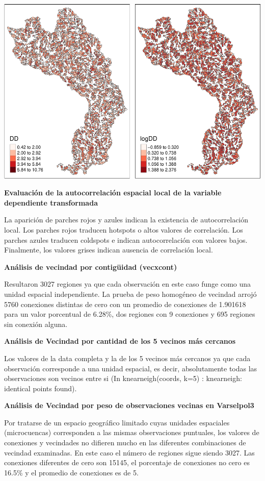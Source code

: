 \documentclass[11pt,]{article}
\begin{document}
\includegraphics{proyecto_f_files/figure-latex/unnamed-chunk-16-1.pdf}

\textbf{Evaluación de la autocorrelación espacial local de la variable
dependiente transformada}

La aparición de parches rojos y azules indican la existencia de
autocorrelación local. Los parches rojos traducen hotspots o altos
valores de correlación. Los parches azules traducen coldspots e indican
autocorrelación con valores bajos. Finalmente, los valores grises
indican ausencia de correlación local.

\textbf{Análisis de vecindad por contigüidad (vecxcont)}

Resultaron 3027 regiones ya que cada observación en este caso funge como
una unidad espacial independiente. La prueba de peso homogéneo de
vecindad arrojó 5760 conexiones distintas de cero con un promedio de
conexiones de 1.901618 para un valor porcentual de 6.28\%, dos regiones
con 9 conexiones y 695 regiones sin conexión alguna.

\textbf{Análisis de Vecindad por cantidad de los 5 vecinos más cercanos}

Los valores de la data completa y la de los 5 vecinos más cercanos ya
que cada observación corresponde a una unidad espacial, es decir,
absolutamente todas las observaciones son vecinos entre si (In
knearneigh(coords, k=5) : knearneigh: identical points found).

\textbf{Análisis de Vecindad por peso de observaciones vecinas en
Varselpol3}

Por tratarse de un espacio geográfico limitado cuyas unidades espaciales
(microcuencas) corresponden a las mismas observaciones puntuales, los
valores de conexiones y vecindades no difieren mucho en las diferentes
combinaciones de vecindad examinadas. En este caso el número de regiones
sigue siendo 3027. Las conexiones diferentes de cero son 15145, el
porcentaje de conexiones no cero es 16.5\% y el promedio de conexiones
es de 5.
\end{document}
